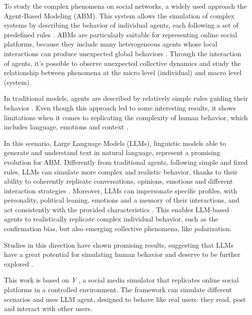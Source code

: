 \medskip
To study the complex phenomena on social networks, a widely used approach the Agent-Based Modeling (ABM).
This system allows the simulation of complex systems by describing the behavior of individual agents, each following a set of predefined rules \cite{macy2002abm}.
ABMs are particularly suitable for representing online social platforms, because they include many heterogeneous agents whose local interactions can produce unexpected global behaviors \cite{gausen2021can}.
Through the interaction of agents, it's possible to observe unexpected collective dynamics and study the relationship between phenomena at the micro level (individual) and macro level (system).

In traditional models, agents are described by relatively simple rules guiding their behavior \cite{conte2014agent}.
Even though this approach led to some interesting results, it shows limitations when it comes to replicating the complexity of human behavior, which includes language, emotions and context \cite{törnberg2023evaluate}.

\medskip
In this scenario, Large Language Models (LLMs), linguistic models able to generate and understand text in natural language, represent a promising evolution for ABM.
Differently from traditional agents, following simple and fixed rules, LLMs can simulate more complex and realistic behavior, thanks to their ability to coherently replicate conversations, opinions, emotions and different interaction strategies \cite{park2023genagents}.
Moreover, LLMs can impersonate specific profiles, with personality, political leaning, emotions and a memory of their interactions, and act consistently with the provided characteristics \cite{rossetti2024ysocialllmpoweredsocial}.
This enables LLM-based agents to realistically replicate complex individual behavior, such as the confirmation bias, but also emerging collective phenomena, like polarization.

Studies in this direction have shown promising results, suggesting that LLMs have a great potential for simulating human behavior and deserve to be further explored \cite{gao2023s3socialnetworksimulationlarge, törnberg2023evaluate, rossetti2024ysocialllmpoweredsocial}.


\medskip
This work is based on \textit{Y} \cite{rossetti2024ysocialllmpoweredsocial}, a social media simulator that replicates online social platforms in a controlled environment.
The framework can simulate different scenarios and uses LLM agent, designed to behave like real users: they read, post and interact with other users.

